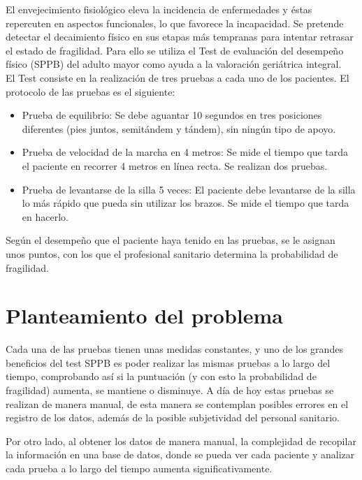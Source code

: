 \documentclass[12pt,oneside,a4paper]{article}
\begin{document}
El envejecimiento fisiológico eleva la incidencia de enfermedades y éstas repercuten en aspectos funcionales, lo que favorece la incapacidad. Se pretende detectar el decaimiento físico en sus etapas más tempranas para intentar retrasar el estado de fragilidad. Para ello se utiliza el Test de evaluación del desempeño físico \cite{welch2021short} (SPPB) del adulto mayor como ayuda a la valoración geriátrica integral. \\
El Test consiste en la realización de tres pruebas a cada uno de los pacientes. El protocolo de las pruebas es el siguiente: \\
\begin{itemize}
\item Prueba de equilibrio: Se debe aguantar 10 segundos en tres posiciones diferentes (pies juntos, semitándem y tándem), sin ningún tipo de apoyo. \\
\item Prueba de velocidad de la marcha en 4 metros: Se mide el tiempo que tarda el paciente en recorrer 4 metros en línea recta. Se realizan dos pruebas.\\
\item Prueba de levantarse de la silla 5 veces: El paciente debe levantarse de la silla lo más rápido que pueda sin utilizar los brazos. Se mide el tiempo que tarda en hacerlo.
\end{itemize}
Según el desempeño que el paciente haya tenido en las pruebas, se le asignan unos puntos, con los que el profesional sanitario determina la probabilidad de fragilidad.

\section{Planteamiento del problema}
\hline
Cada una de las pruebas tienen unas medidas constantes, y uno de los grandes beneficios del test SPPB es poder realizar las mismas pruebas a lo largo del tiempo, comprobando así si la puntuación (y con esto la probabilidad de fragilidad) aumenta, se mantiene o disminuye. 
A día de hoy estas pruebas se realizan de manera manual, de esta manera se contemplan posibles errores en el registro de los datos, además de la posible subjetividad del personal sanitario.

Por otro lado, al obtener los datos de manera manual, la complejidad de recopilar la información en una base de datos, donde se pueda ver cada paciente y analizar cada prueba a lo largo del tiempo aumenta significativamente. 
\end{document}
